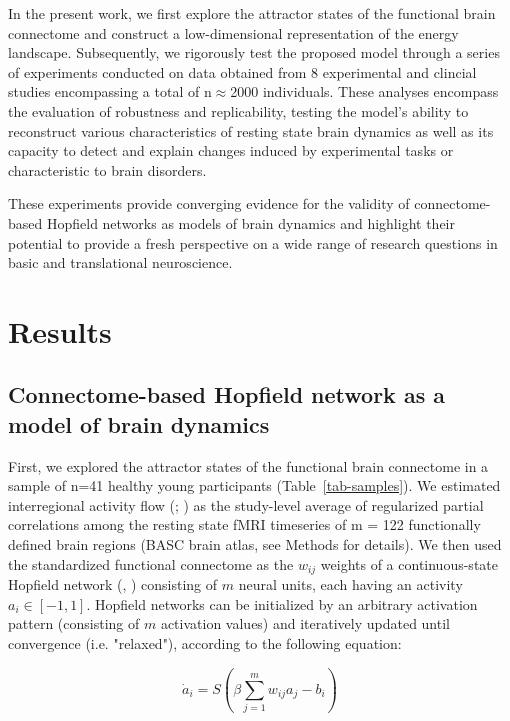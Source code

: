 \documentclass{article}
\begin{document}
In the present work, we first explore the attractor states of the functional brain connectome and construct a low-dimensional representation of the energy landscape.
Subsequently, we rigorously test the proposed model through a series of experiments conducted on data obtained from 8 experimental and clincial studies encompassing a total of n$\approx$2000 individuals.
These analyses encompass the evaluation of robustness and replicability, testing the model's ability to reconstruct various characteristics of resting state brain dynamics as well as its capacity to detect and explain changes induced by experimental tasks or characteristic to brain disorders.

These experiments provide converging evidence for the validity of connectome-based Hopfield networks as models of brain dynamics and highlight their potential to provide a fresh perspective on a wide range of research questions in basic and translational neuroscience.

\section{Results}\label{Results}

\subsection{Connectome-based Hopfield network as a model of brain dynamics}\label{Connectome-based Hopfield network as a model of brain dynamics}

First, we explored the attractor states of the functional brain connectome in a sample of n=41 healthy young participants (Table~\ref{tab-samples}).
We estimated interregional activity flow (\cite{Cole_2016}; \cite{Ito_2017}) as the study-level average of regularized partial correlations among the resting state fMRI timeseries of m = 122 functionally defined brain regions (BASC brain atlas, see Methods for details).
We then used the standardized functional connectome as the $w_{ij}$  weights of a continuous-state Hopfield network (\cite{Hopfield_1982}, \cite{Koiran_1994}) consisting of $m$ neural units, each having an activity $a_i \in [ -1,1]$.
Hopfield networks can be initialized by an arbitrary activation pattern (consisting of $m$ activation values) and iteratively updated until convergence (i.e. "relaxed"), according to the following equation:

\begin{equation}
\label{hopfield-update}
\dot{a}_i = S(\beta \sum_{j=1}^m w_{ij}a_j - b_i)
\end{equation}
\end{document}
